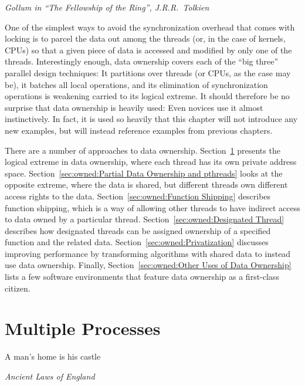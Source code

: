 
%
	 {\emph{Gollum in ``The Fellowship of the Ring'', J.R.R.~Tolkien}}

One of the simplest ways to avoid the synchronization overhead that
comes with locking is to parcel the data out among the threads (or,
in the case of kernels, CPUs)
so that a given piece of data is accessed and modified by only one
of the threads.
Interestingly enough, data ownership covers each of the ``big three''
parallel design techniques:
It partitions over threads (or CPUs, as the case may be),
it batches all local operations,
and its elimination of synchronization operations is weakening
carried to its logical extreme.
It should therefore be no surprise that data ownership is heavily used:
Even novices use it almost instinctively.
In fact, it is used so heavily that this chapter will not introduce
any new examples, but will instead reference examples from previous
chapters.

\QuickQuizEnd

There are a number of approaches to data ownership.
Section~\ref{sec:owned:Multiple Processes} presents the logical extreme
in data ownership, where each thread has its own private address space.
Section~\ref{sec:owned:Partial Data Ownership and pthreads} looks at
the opposite extreme, where the data is shared, but different threads
own different access rights to the data.
Section~\ref{sec:owned:Function Shipping} describes function shipping,
which is a way of allowing other threads to have indirect access to
data owned by a particular thread.
Section~\ref{sec:owned:Designated Thread} describes how designated
threads can be assigned ownership of a specified function and the
related data.
Section~\ref{sec:owned:Privatization} discusses improving performance
by transforming algorithms with shared data to instead use data ownership.
Finally, Section~\ref{sec:owned:Other Uses of Data Ownership} lists
a few software environments that feature data ownership as a
first-class citizen.

\section{Multiple Processes}
\label{sec:owned:Multiple Processes}
%
\epigraph{A man's home is his castle}{\emph{Ancient Laws of England}}

